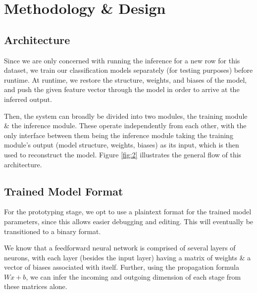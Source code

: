 \documentclass[12pt, titlepage]{article}
\begin{document}
\section{Methodology \& Design}
\subsection{Architecture}
Since we are only concerned with running the inference for a new row for this dataset, we train our classification models separately (for testing purposes) before runtime. At runtime, we restore the structure, weights, and biases of the model, and push the given feature vector through the model in order to arrive at the inferred output.\bigskip

Then, the system can broadly be divided into two modules, the training module \& the inference module. These operate independently from each other, with the only interface between them being the inference module taking the training module's output (model structure, weights, biases) as its input, which is then used to reconstruct the model. Figure \ref{fig:2} illustrates the general flow of this architecture.

\subsection{Trained Model Format}
For the prototyping stage, we opt to use a plaintext format for the trained model parameters, since this allows easier debugging and editing. This will eventually be transitioned to a binary format.\bigskip

We know that a feedforward neural network is comprised of several layers of neurons, with each layer (besides the input layer) having a matrix of weights \& a vector of biases associated with itself. Further, using the propagation formula $Wx + b$, we can infer the incoming and outgoing dimension of each stage from these matrices alone.\bigskip
\end{document}
